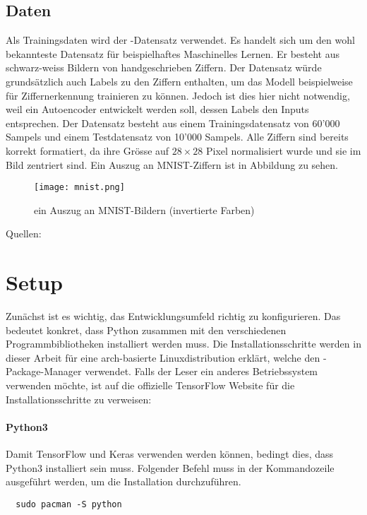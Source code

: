 \subsection{Daten}
Als Trainingsdaten wird der -Datensatz verwendet. Es handelt sich
um den wohl bekannteste Datensatz für beispielhaftes Maschinelles Lernen.
Er besteht aus schwarz-weiss Bildern von handgeschrieben Ziffern.
Der Datensatz würde grundsätzlich auch Labels zu den Ziffern enthalten, um das Modell beispielweise
für Ziffernerkennung trainieren zu können. Jedoch ist dies hier nicht notwendig,
weil ein Autoencoder entwickelt werden soll, dessen Labels den Inputs entsprechen.
\para{}
Der Datensatz besteht aus einem Trainingsdatensatz von 60'000 Sampels und einem Testdatensatz
von 10'000 Sampels. Alle Ziffern sind bereits korrekt formatiert, da ihre Grösse
auf $28 \times 28$ Pixel normalisiert wurde und sie im Bild zentriert sind. Ein
Auszug an MNIST-Ziffern ist in Abbildung  zu sehen.
\para{}
\begin{figure}[h!]
  \centering
  \texttt{[image: mnist.png]}
  \caption{ein Auszug an MNIST-Bildern (invertierte Farben) \cite{res:mnist_images}}
  \label{fig:minst}
\end{figure}
\para{}
Quellen: \cite{net:mnist}

\section{Setup}
Zunächst ist es wichtig, das Entwicklungsumfeld richtig zu konfigurieren. Das
bedeutet konkret, dass Python zusammen mit den verschiedenen Programmbibliotheken
installiert werden muss.
\para{}
Die Installationsschritte werden in dieser Arbeit für eine arch-basierte
Linuxdistribution erklärt, welche den -Package-Manager verwendet.
\para{}
Falls der Leser ein anderes Betriebssystem verwenden möchte, ist auf die offizielle
TensorFlow Website für die Installationsschritte zu verweisen:
\para{}

\paragraph{Python3}
Damit TensorFlow und Keras verwenden werden können, bedingt dies, dass Python3
installiert sein muss.
Folgender Befehl muss in der Kommandozeile ausgeführt werden, um die
Installation durchzuführen.
\begin{verbatim}
  sudo pacman -S python
\end{verbatim}

